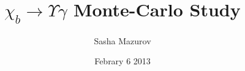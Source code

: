 
\title[$\chi_b \rightarrow \Upsilon \gamma $ Monte-Carlo Study]{$\chi_b \rightarrow \Upsilon \gamma $ Monte-Carlo Study}
\author[A. Mazurov]
{Sasha Mazurov}

\date{Febrary 6 2013}
